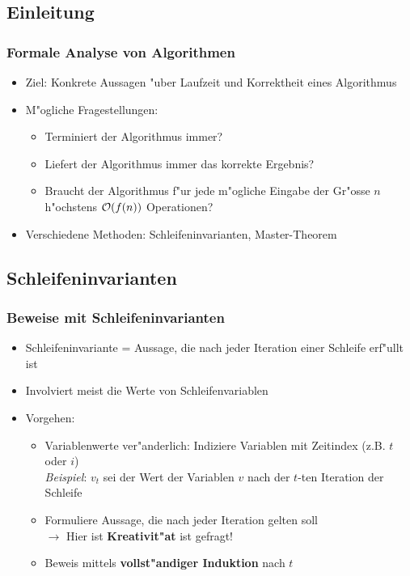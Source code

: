 \subsection{Einleitung}
\begin{frame}
  \frametitle{Formale Analyse von Algorithmen}
  \begin{itemize}
  \item Ziel: Konkrete Aussagen "uber Laufzeit und Korrektheit eines Algorithmus
  \item M"ogliche Fragestellungen:
    \begin{itemize}
    \item Terminiert der Algorithmus immer?
    \item Liefert der Algorithmus immer das korrekte Ergebnis?
    \item Braucht der Algorithmus f"ur jede m"ogliche Eingabe der Gr"osse $n$
          h"ochstens $\mathcal{O}(f(n))$ Operationen?
    \end{itemize}
  \item Verschiedene Methoden: Schleifeninvarianten, Master-Theorem
  \end{itemize}
\end{frame}

\subsection{Schleifeninvarianten}
\begin{frame}
  \frametitle{Beweise mit Schleifeninvarianten}
  \begin{itemize}
  \item Schleifeninvariante = Aussage, die nach jeder Iteration einer Schleife erf"ullt ist
  \item Involviert meist die Werte von Schleifenvariablen
  \item Vorgehen:
    \begin{itemize}
    \item Variablenwerte ver"anderlich: Indiziere Variablen mit Zeitindex (z.B. $t$ oder $i$) \\
          \emph{Beispiel}: $v_t$ sei der Wert der Variablen $v$ nach
                           der $t$-ten Iteration der Schleife
    \item Formuliere Aussage, die nach jeder Iteration gelten soll \\
          $\rightarrow$ Hier ist \textbf{Kreativit"at} ist gefragt!
    \item Beweis mittels \textbf{vollst"andiger Induktion} nach $t$
    \end{itemize}
  \end{itemize}
\end{frame}

